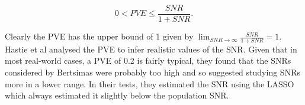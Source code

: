 \begin{appendices}
\begin{equation}
    0<PVE \leq \frac{SNR}{1+SNR}.
\end{equation}

Clearly the PVE has the upper bound of 1 given by $\lim_{SNR\xrightarrow{}\infty}\frac{SNR}{1+SNR} = 1$. Hastie et al  analysed the PVE to infer realistic values of the SNR. Given that in most real-world cases, a PVE of 0.2 is fairly typical, they found that the SNRs considered by Bertsimas  were probably too high and so suggested studying SNRs more in a lower range. In their tests, they estimated the SNR using the LASSO which always estimated it slightly below the population SNR.

\end{appendices}